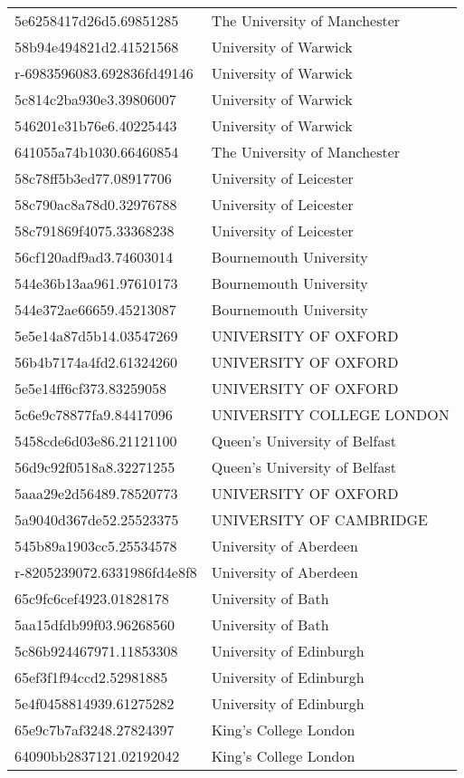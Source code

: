 \begin{tabular}{ll}
5e6258417d26d5.69851285 & The University of Manchester \\
58b94e494821d2.41521568 & University of Warwick \\
r-6983596083.692836fd49146 & University of Warwick \\
5c814c2ba930e3.39806007 & University of Warwick \\
546201e31b76e6.40225443 & University of Warwick \\
641055a74b1030.66460854 & The University of Manchester \\
58c78ff5b3ed77.08917706 & University of Leicester \\
58c790ac8a78d0.32976788 & University of Leicester \\
58c791869f4075.33368238 & University of Leicester \\
56cf120adf9ad3.74603014 & Bournemouth University \\
544e36b13aa961.97610173 & Bournemouth University \\
544e372ae66659.45213087 & Bournemouth University \\
5e5e14a87d5b14.03547269 & UNIVERSITY OF OXFORD \\
56b4b7174a4fd2.61324260 & UNIVERSITY OF OXFORD \\
5e5e14ff6cf373.83259058 & UNIVERSITY OF OXFORD \\
5c6e9c78877fa9.84417096 & UNIVERSITY COLLEGE LONDON \\
5458cde6d03e86.21121100 & Queen's University of Belfast \\
56d9c92f0518a8.32271255 & Queen's University of Belfast \\
5aaa29e2d56489.78520773 & UNIVERSITY OF OXFORD \\
5a9040d367de52.25523375 & UNIVERSITY OF CAMBRIDGE \\
545b89a1903cc5.25534578 & University of Aberdeen \\
r-8205239072.6331986fd4e8f8 & University of Aberdeen \\
65c9fc6cef4923.01828178 & University of Bath \\
5aa15dfdb99f03.96268560 & University of Bath \\
5c86b924467971.11853308 & University of Edinburgh \\
65ef3f1f94ccd2.52981885 & University of Edinburgh \\
5e4f0458814939.61275282 & University of Edinburgh \\
65e9c7b7af3248.27824397 & King's College London \\
64090bb2837121.02192042 & King's College London \\

\end{tabular}
